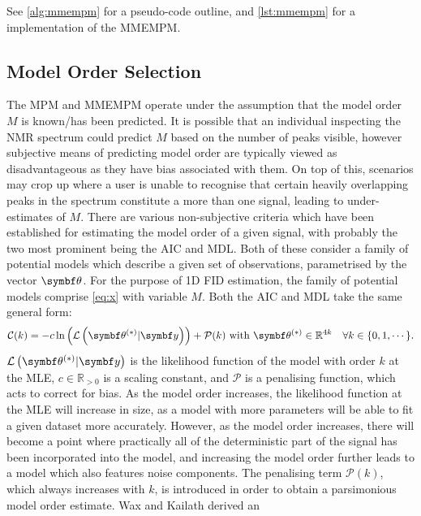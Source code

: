 See \cref{alg:mmempm} for a pseudo-code outline, and \cref{lst:mmempm} for a
\Python implementation of the \ac{MMEMPM}.

\subsection{Model Order Selection}
\label{subsec:model-order}
The \ac{MPM} and \ac{MMEMPM} operate under the assumption that the model order
$M$ is known/has been predicted.
It is possible that an individual inspecting the \ac{NMR} spectrum could
predict $M$ based on the number of peaks visible, however subjective means of
predicting model order are typically viewed as disadvantageous as they have bias
associated with them. On top of this, scenarios may crop up where a user is
unable to recognise that certain heavily overlapping peaks in the spectrum
constitute a more than one signal, leading to under-estimates of $M$.
There are various non-subjective criteria which have been established for
estimating the model order of a given signal, with probably the two most
prominent being the \ac{AIC}\cite{Akaike1974} and
\ac{MDL}\cite{Schwarz1978,Rissanen1978}. Both of these consider a family of
potential models which describe a given set of observations, parametrised by
the vector $\bth$. For the purpose of \ac{1D} \ac{FID} estimation, the family
of potential models comprise \cref{eq:x} with variable $M$. Both the \ac{AIC}
and \ac{MDL} take the same general form:
\begin{equation}
    \mathcal{C}(k) = -c \ln \left(\mathcal{L} \left(\bthstar | \by \right)
    \right) + \mathcal{P}(k) \text{ with } \bthstar \in \mathbb{R}^{4k}
    \quad \forall k \in \lbrace 0, 1, \cdots \rbrace.
\end{equation}
 $\mathcal{L} \left(\bthstar |
\by \right)$ is the likelihood
function of the model with order $k$ at the \ac{MLE}, $c \in
\mathbb{R}_{>0}$ is a scaling constant, and $\mathcal{P}$ is a penalising
function, which acts to correct
for bias. As the model order increases, the likelihood function at the \ac{MLE}
will increase in size, as a model with more parameters will be able to fit a
given dataset more accurately. However, as the model order increases, there will
become a point where practically all of the deterministic part of the signal
has been incorporated into the model, and increasing the model order further
leads to a model which also features noise components. The penalising
term $\mathcal{P}(k)$, which always increases with $k$, is introduced in order to
obtain a parsimonious model order estimate. Wax and Kailath derived an
